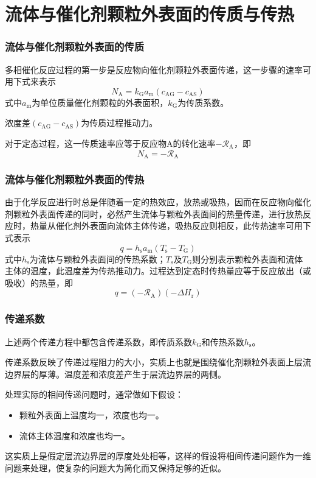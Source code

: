 \section{流体与催化剂颗粒外表面的传质与传热}


\begin{frame}
    \frametitle{流体与催化剂颗粒外表面的传质}

    多相催化反应过程的第一步是反应物向催化剂颗粒外表面传递，这一步骤的速率可用下式来表示
    \[
        N_{\mathrm{A}} =k_{\mathrm{G}} a_{\mathrm{m}}(c_{\mathrm{AG}}-c_{\mathrm{AS}})
    \]
    式中$a_{\mathrm{m}}$为单位质量催化剂颗粒的外表面积，$k_{\mathrm{G}}$为传质系数。
    
    浓度差$(c_{\mathrm{AG}}-c_{\mathrm{AS}})$为传质过程推动力。
    
    对于定态过程，这一传质速率应等于反应物A的转化速率$-\mathscr{R}_{\mathrm{A}}$，即
    \[
        N_{\mathrm{A}} = -\mathscr{R}_{\mathrm{A}}
    \]

\end{frame}


\begin{frame}
    \frametitle{流体与催化剂颗粒外表面的传热}

    由于化学反应进行时总是伴随着一定的热效应，放热或吸热，因而在反应物向催化剂颗粒外表面传递的同时，必然产生流体与颗粒外表面间的热量传递，进行放热反应时，热量从催化剂外表面向流体主体传递，吸热反应则相反，此传热速率可用下式表示
    \[
        q = h_{\mathrm{s}} a_{\mathrm{m}}(T_{\mathrm{s}}-T_{\mathrm{G}})
    \]
    式中$h_{\mathrm{s}}$为流体与颗粒外表面间的传热系数；$T_{\mathrm{s}}$及$T_{\mathrm{G}}$则分别表示颗粒外表面和流体主体的温度，此温度差为传热推动力。过程达到定态时传热量应等于反应放出（或吸收）的热量，即
    \[
        q =(-\mathscr{R}_{\mathrm{A}})(-\Delta H_{\mathrm{r}})
    \]

\end{frame}


\begin{frame}
    \frametitle{传递系数}

    上述两个传递方程中都包含传递系数，即传质系数$k_{\mathrm{G}}$和传热系数$h_{\mathrm{s}}$。
    
    传递系数反映了传递过程阻力的大小，实质上也就是围绕催化剂颗粒外表面上层流边界层的厚薄。温度差和浓度差产生于层流边界层的两侧。
    
    处理实际的相间传递问题时，通常做如下假设：
    \begin{itemize}
        \item 颗粒外表面上温度均一，浓度也均一。
        \item 流体主体温度和浓度也均一。
    \end{itemize}
    这实质上是假定层流边界层的厚度处处相等，这样的假设将相间传递问题作为一维问题来处理，使复杂的问题大为简化而又保持足够的近似。
    
\end{frame}


